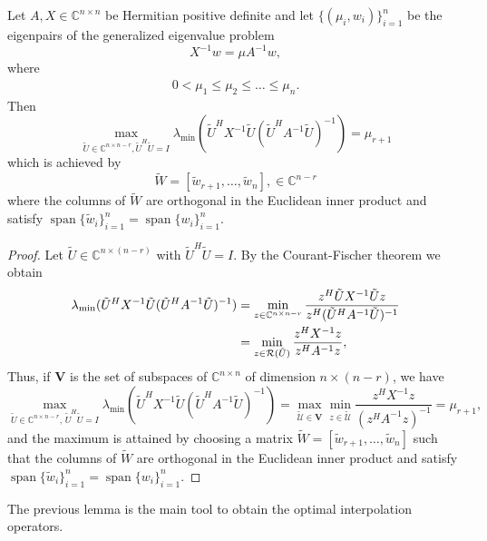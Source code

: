 \documentclass[final]{siamltex}
\newcommand{\innCnn}{\in\mathbb{C}^{n\times n}}
\newcommand{\innbCnnmr}{\in\mathbb{C}^{n\times n-r}}
\DeclareMathOperator*{\spann}{span}
\newcommand{\beq}{\begin{eqnarray}}
\newcommand{\eeq}{\end{eqnarray}}
\numberwithin{equation}{section}
\newcommand{\im} {{\cal R}}
\newcommand{\C}{\mathbb{C}}
\newcommand{\Cnn}{\mathbb{C}^{n \times n}}
\newcommand{\Cnnr}{\mathbb{C}^{n \times n-r}}
\begin{document}
\begin{lemma} \label{theo:main}
Let $A, X \innCnn$ be Hermitian positive definite and let
$\{(\mu_i,w_i)\}_{i=1}^n$ be the eigenpairs of the generalized eigenvalue
problem
 \[X^{-1}w = \mu
A^{-1}w,\]
where
\beq
0 < \mu_1 \leq \mu_2 \leq \ldots \leq  \mu_n.
\eeq
Then
\[\max_{\tilde U \innbCnnmr, \tilde U^H \tilde U=I} \lambda_{\min} (\tilde
U^HX^{-1}\tilde U
(\tilde
U^HA^{-1}\tilde U)^{-1}) = \mu_{r+1}
\]
which is achieved by 
\[
\tilde W = [\tilde{w}_{r+1}, \ldots, \tilde{w}_n],
\in \C^{n-r}\] 
where the columns of $\tilde W$ are orthogonal in the Euclidean inner 
product and satisfy
$\spann\{\tilde{w}_i\}_{i=1}^n = \spann\{w_i\}_{i=1}^n$.
\end{lemma}

\begin{proof}
Let $\tilde{U} \in \C^{n \times (n-r)}$ with $\tilde{U}^H\tilde{U} = I$. By the
Courant-Fischer theorem we obtain 
\begin{align*}
\lambda_{\min} (\tilde U^HX^{-1}\tilde U (\tilde U^HA^{-1}\tilde U)^{-1}) & =
\min_{z \in \Cnnr} \frac{z^H \tilde U X^{-1} \tilde U z }{ z^H
(\tilde U^H A^{-1} \tilde U)^{-1}}\\
& = \min_{ z \in \im(\tilde U)}\frac{z^{H} X^{-1}z}{z^HA^{-1}z}, 
\end{align*}
Thus, if $\mathbf{V}$ is the set of subspaces of $\Cnn$ of dimension $n \times
(n-r)$, we have
\[\max_{\tilde{U} \in \Cnnr, \, \tilde{U}^H\tilde U = I }
\lambda_{\min} (\tilde U^HX^{-1}\tilde U (\tilde U^HA^{-1}\tilde U)^{-1}) =
\max_{\tilde{\mathcal{U}} \in \mathbf V } \min_{z \in \tilde{\mathcal{U}}}
\frac{z^H X^{-1} z}{(z^HA^{-1}z)^{-1}}  = \mu_{r+1},
\]
and the maximum is attained by choosing a matrix $\tilde W =
[\tilde w_{r+1}, \ldots, \tilde w _{n}]$ such that 
the columns of $\tilde W$ are orthogonal in the Euclidean inner 
product and satisfy
$\spann\{\tilde{w}_i\}_{i=1}^n = \spann\{w_i\}_{i=1}^n$. 
\end{proof}

The previous lemma is the main tool to obtain the optimal interpolation
operators.
\end{document}
